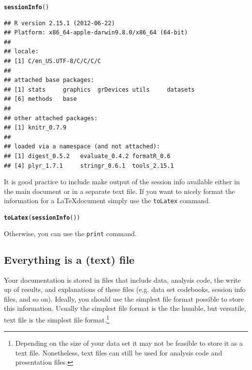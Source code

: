 \documentclass[ChapterTOCs,krantz1]{krantz}\usepackage{graphicx, color}
\makeatletter
\newcommand{\hlfunctioncall}[1]{\textcolor[rgb]{0.501960784313725,0,0.329411764705882}{\textbf{#1}}}%
\newenvironment{kframe}{%
 \def\at@end@of@kframe{}%
 \ifinner\ifhmode%
  \def\at@end@of@kframe{\end{minipage}}%
  \begin{minipage}{\columnwidth}%
 \fi\fi%
 \def\FrameCommand##1{\hskip\@totalleftmargin \hskip-\fboxsep
 \colorbox{shadecolor}{##1}\hskip-\fboxsep
     \hskip-\linewidth \hskip-\@totalleftmargin \hskip\columnwidth}%
 \MakeFramed {\advance\hsize-\width
   \@totalleftmargin\z@ \linewidth\hsize
   \@setminipage}}%
 {\par\unskip\endMakeFramed%
 \at@end@of@kframe}
\newenvironment{knitrout}{}{} %
\makeatother
\begin{document}
\begin{knitrout}
\color{fgcolor}\begin{kframe}
\begin{alltt}
\hlfunctioncall{sessionInfo}()
\end{alltt}
\begin{verbatim}
## R version 2.15.1 (2012-06-22)
## Platform: x86_64-apple-darwin9.8.0/x86_64 (64-bit)
## 
## locale:
## [1] C/en_US.UTF-8/C/C/C/C
## 
## attached base packages:
## [1] stats     graphics  grDevices utils     datasets 
## [6] methods   base     
## 
## other attached packages:
## [1] knitr_0.7.9
## 
## loaded via a namespace (and not attached):
## [1] digest_0.5.2   evaluate_0.4.2 formatR_0.6   
## [4] plyr_1.7.1     stringr_0.6.1  tools_2.15.1
\end{verbatim}
\end{kframe}
\end{knitrout}


\noindent It is good practice to include make output of the session info available either in the main document or in a separate text file. If you want to nicely format the information for a \LaTeX document simply use the {\tt{toLatex}} command.

\begin{knitrout}
\color{fgcolor}\begin{kframe}
\begin{alltt}
\hlfunctioncall{toLatex}(\hlfunctioncall{sessionInfo}())
\end{alltt}
\end{kframe}
\end{knitrout}


\noindent Otherwise, you can use the {\tt{print}} command. 

\subsection{Everything is a (text) file}

Your documentation is stored in files that include data, analysis code, the write up of results, and explanations of these files (e.g. data set codebooks, session info files, and so on). Ideally, you should use the simplest file format possible to store this information. Usually the simplest file format is the the humble, but versatile, text file is the simplest file format.\footnote{Depending on the size of your data set it may not be feasible to store it as a text file. Nonetheless, text files can still be used for analysis code and presentation files.} 
\end{document}
